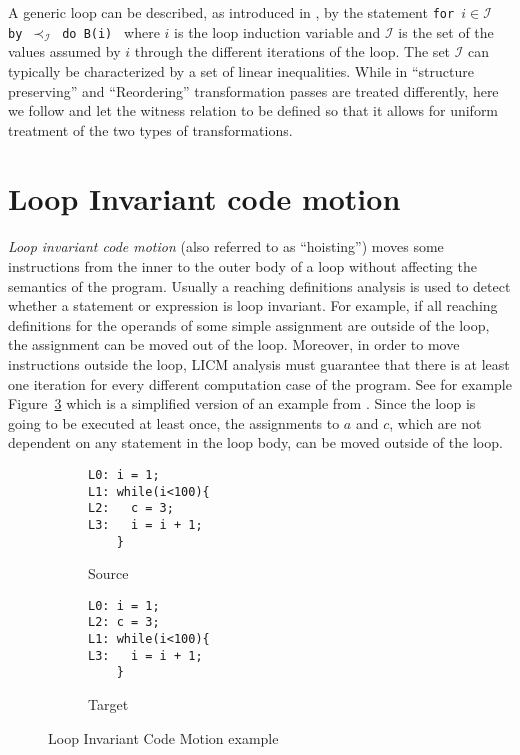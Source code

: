 A generic loop can be described, as introduced in \cite{zuck2005translation}, by the statement \texttt{for $i \in \mathcal{I}$ by $\prec_{\mathcal{I}}$ do B(i) } where $i$ is the loop induction variable and $\mathcal{I}$ is the set of the values assumed by $i$ through the different iterations of the loop. The set $\mathcal{I}$ can typically be characterized by a set of linear inequalities. While in \cite{zuck2005translation} ``structure preserving'' and ``Reordering'' transformation passes are treated differently, here we follow \cite{zucknamjoshi} and let the witness relation to be defined so that it allows for uniform treatment of the two types of transformations.

\section{Loop Invariant code motion}
\label{sec:a_simple_reordering_transformation}

\emph{Loop invariant code motion} (also referred to as ``hoisting'') moves some instructions from the inner to the outer body of a loop without affecting the semantics of the program. Usually a reaching definitions analysis is used to detect whether a statement or expression is loop invariant. For example, if all reaching definitions for the operands of some simple assignment are outside of the loop, the assignment can be moved out of the loop. Moreover, in order to move instructions outside the loop, LICM analysis must guarantee that there is at least one iteration for every different computation case of the program. See for example Figure~\ref{fig:licm_th} which is a simplified version of an example from \cite{steven1997advanced}. Since the loop is going to be executed at least once, the assignments to $a$ and $c$, which are not dependent on any statement in the loop body, can be moved outside of the loop.

\begin{figure}[t]
  \begin{mdframed}
  \centering
  \begin{subfigure}[b]{0.49\textwidth}
    \centering
    \begin{lstlisting}
L0: i = 1;
L1: while(i<100){
L2:   c = 3;
L3:   i = i + 1;
    }
    \end{lstlisting}
    \caption{Source}
    \label{fig:slicm_th}
  \end{subfigure}
  \begin{subfigure}[b]{0.49\textwidth}
    \centering
    \begin{lstlisting}
L0: i = 1;
L2: c = 3;
L1: while(i<100){
L3:   i = i + 1;
    }
    \end{lstlisting}
    \caption{Target}
    \label{fig:tlicm_th}
  \end{subfigure}
  \end{mdframed}
  \caption{Loop Invariant Code Motion example}
  \label{fig:licm_th}
\end{figure}

